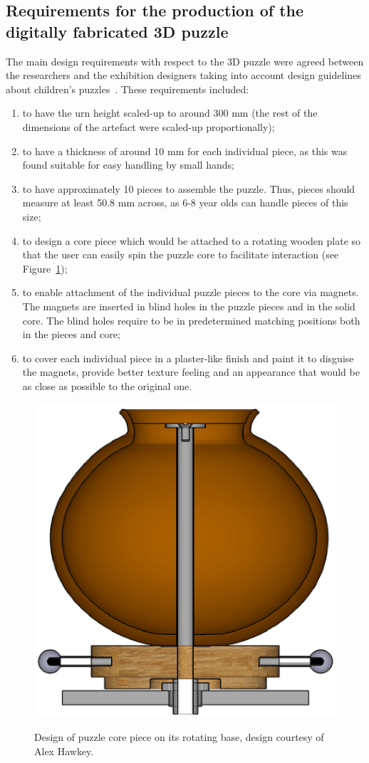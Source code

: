 \documentclass[acmlarge,screen,dvipsnames]{acmart}
\begin{document}
\subsection{Requirements for the production of the digitally fabricated 3D puzzle}

The main design requirements with respect to the 3D puzzle were agreed
between the researchers and the exhibition designers taking into
account design guidelines about children's
puzzles~\cite{Smith2002}. These requirements included:
%
\begin{enumerate}
\item to have the urn height scaled-up to around 300 mm (the rest of
  the dimensions of the artefact were scaled-up proportionally);
\item to have a thickness of around 10 mm for each individual piece,
  as this was found suitable for easy handling by small hands;
\item to have approximately 10 pieces to assemble the puzzle. Thus,
  pieces should measure at least 50.8 mm across, as 6-8 year olds can
  handle pieces of this size;
\item to design a core piece which would be attached to a rotating
  wooden plate so that the user can easily spin the puzzle core to
  facilitate interaction (see Figure~\ref{fig:alexdesign});
\item to enable attachment of the individual puzzle pieces to the core
  via magnets. The magnets are inserted in blind holes in the puzzle
  pieces and in the solid core. The blind holes require to be in
  predetermined matching positions both in the pieces and core;
\item to cover each individual piece in a plaster-like finish and
  paint it to disguise the magnets, provide better texture feeling and
  an appearance that would be as close as possible to the original one.
\end{enumerate} 
%
\begin{figure}[htb]
  \centering
  \includegraphics[width=0.5\linewidth]{images/alexdesign}\\[-0.5\baselineskip]
  \caption{\label{fig:alexdesign}%
    Design of puzzle core piece on its rotating base, design courtesy of Alex Hawkey.\vspace*{-1\baselineskip}}
\end{figure}
\end{document}
